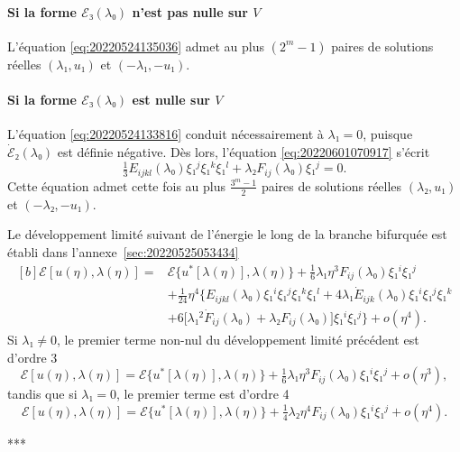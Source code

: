 \documentclass[12pt, final]{amsart}
\theoremstyle{definition}
\begin{document}
\paragraph{Si la forme \(ℰ₃(λ₀)\) n'est pas nulle sur \(V\)} L'équation
\eqref{eq:20220524135036} admet au plus \((2^m - 1)\) paires de solutions
réelles \((λ₁, u₁)\) et \((- λ₁, - u₁)\). 

\paragraph{Si la forme \(ℰ₃(λ₀)\) est nulle sur \(V\)} L'équation
\eqref{eq:20220524133816} conduit nécessairement à \(λ₁ = 0\), puisque
\(\dot{ℰ}₂(λ₀)\) est définie négative. Dès lors, l'équation
\eqref{eq:20220601070917} s'écrit 
\begin{equation}
 \tfrac{1}{3} E_{ijkl}(λ₀) ξ₁^j ξ₁^k ξ₁^l + λ₂ F_{ij}(λ₀) ξ₁^j = 0.
\end{equation}
Cette équation admet cette fois au plus \(\frac{3^m - 1}{2}\) paires de
solutions réelles \((λ₂, u₁)\) et \((- λ₂, - u₁)\). 

Le développement limité suivant de l'énergie le long de la branche bifurquée est
établi dans l'annexe~\ref{sec:20220525053434}
\begin{equation}
  \label{eq:20220525053600}
  \begin{aligned}[b]
    ℰ[u(η), λ(η)] ={}
    & ℰ\{u^{\ast}[λ(η)], λ(η)\} + \tfrac{1}{6} λ₁ η^3 F_{i j}(λ₀) ξ₁^i ξ₁^j\\
    & + \tfrac{1}{24} η^4 \bigl\{E_{ijkl}(λ₀) ξ₁^i ξ₁^j ξ₁^k ξ₁^l + 4λ₁ \dot{E}_{ijk}(λ₀) ξ₁^i ξ₁^j ξ₁^k\\
    & + 6 \bigl[λ₁^2 \dot{F}_{ij}(λ₀) + λ₂ F_{ij}(λ₀)\bigr] ξ₁^i ξ₁^j\bigr\} + o(η^4).
  \end{aligned}
\end{equation}
Si \(λ₁ ≠ 0\), le premier terme non-nul du développement limité précédent est
d'ordre 3
\begin{equation}
 ℰ [u(η), λ(η)] = ℰ\{u^{\ast}[λ(η)], λ(η)\} + \tfrac{1}{6} λ₁ η^3 F_{ij}(λ₀) ξ₁^i ξ₁^j + o(η^3),
\end{equation}
tandis que si \(λ₁ = 0\), le premier terme est d'ordre 4
\begin{equation}
 ℰ[u(η), λ(η)] = ℰ\{u^{\ast} [λ(η)], λ(η)\} + \tfrac{1}{4} λ₂ η^4 F_{ij}(λ₀) ξ₁^i ξ₁^j + o(η^4).
\end{equation}
\begin{center}
 ***
\end{center}
\end{document}
